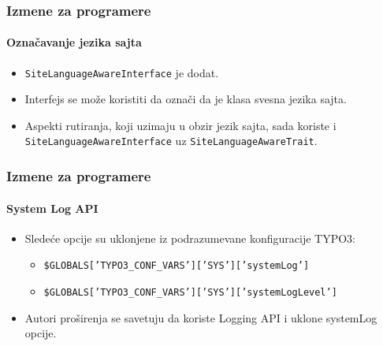
\begin{frame}[fragile]
	\frametitle{Izmene za programere}
	\framesubtitle{Označavanje jezika sajta}

	\lstset{basicstyle=\tiny\ttfamily}


	\begin{itemize}
		\item \texttt{SiteLanguageAwareInterface} je dodat.
		\item Interfejs se može koristiti da označi da je klasa svesna jezika sajta.
		\item Aspekti rutiranja, koji uzimaju u obzir jezik sajta,
			sada koriste i \texttt{SiteLanguageAwareInterface}
			uz \texttt{SiteLanguageAwareTrait}.
	\end{itemize}

\end{frame}


\begin{frame}[fragile]
	\frametitle{Izmene za programere}
	\framesubtitle{System Log API}

	\lstset{basicstyle=\tiny\ttfamily}

	\begin{itemize}
		\item Sledeće opcije su uklonjene iz podrazumevane konfiguracije TYPO3:

			\begin{itemize}\smaller
				\item \texttt{\$GLOBALS['TYPO3\_CONF\_VARS']['SYS']['systemLog']}
				\item \texttt{\$GLOBALS['TYPO3\_CONF\_VARS']['SYS']['systemLogLevel']}
			\end{itemize}\normalsize

		\item Autori proširenja se savetuju da koriste Logging API i uklone systemLog opcije.
	\end{itemize}

\end{frame}

